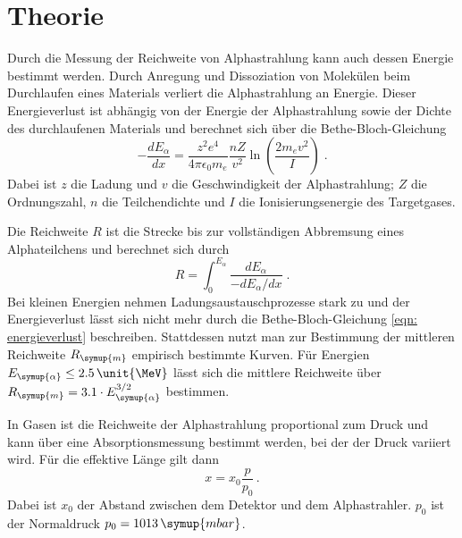 \section{Theorie}
\label{sec:Theorie}

Durch die Messung der Reichweite von Alphastrahlung kann auch dessen
Energie bestimmt werden. Durch Anregung und Dissoziation von Molekülen beim 
Durchlaufen eines Materials verliert die Alphastrahlung an Energie. Dieser
Energieverlust ist abhängig von der Energie der Alphastrahlung sowie der
Dichte des durchlaufenen Materials und berechnet sich über die Bethe-Bloch-Gleichung
\begin{equation}
    -\frac{d E_\alpha}{d x}=\frac{z^2 e^4}{4 \pi \epsilon_0 m_e} \frac{n Z}{v^2} \ln \left(\frac{2 m_e v^2}{I}\right) \; .
    \label{eqn: energieverlust}
\end{equation}
Dabei ist $z$ die Ladung und $v$ die Geschwindigkeit der Alphastrahlung; $Z$ die Ordnungszahl,
$n$ die Teilchendichte und $I$ die Ionisierungsenergie des Targetgases. 

Die Reichweite $R$ ist die Strecke bis zur vollständigen Abbremsung eines 
Alphateilchens und berechnet sich durch 
\begin{equation*}
    R=\int_0^{E_\alpha} \frac{d E_\alpha}{-d E_\alpha / d x} \; .
\end{equation*}
Bei kleinen Energien nehmen Ladungsaustauschprozesse stark zu und der
Energieverlust lässt sich nicht mehr durch die Bethe-Bloch-Gleichung 
\eqref{eqn: energieverlust} beschreiben. Stattdessen nutzt man zur Bestimmung
der mittleren Reichweite $R_{\symup{m}}$ empirisch bestimmte Kurven. Für 
Energien $E_{\symup{\alpha}} \leq 2.5 \, \unit{\MeV}$ lässt sich die mittlere 
Reichweite über $R_{\symup{m}} = 3.1 \cdot E_{\symup{\alpha}}^{3/2}$ bestimmen.

In Gasen ist die Reichweite der Alphastrahlung proportional zum Druck und kann
über eine Absorptionsmessung bestimmt werden, bei der der Druck variiert wird.
Für die effektive Länge gilt dann 
\begin{equation*}
    x = x_0 \frac{p}{p_0} \, .
\end{equation*}
Dabei ist $x_0$ der Abstand zwischen dem Detektor und dem Alphastrahler. 
$p_0$ ist der Normaldruck $p_0 = 1013 \, \symup{mbar}$.